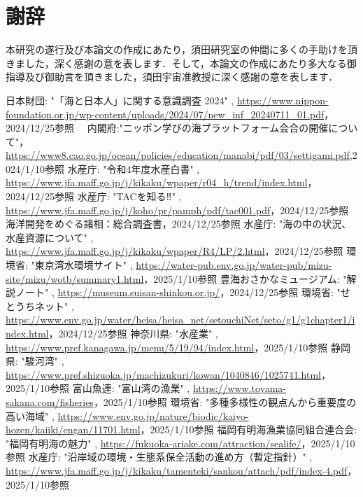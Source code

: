 \documentclass[12pt,a4j,titlepage]{ltjsarticle}
\begin{document}
\section{謝辞}
本研究の遂行及び本論文の作成にあたり，須田研究室の仲間に多くの手助けを頂きました，深く感謝の意を表します．そして，本論文の作成にあたり多大なる御指導及び御助言を頂きました，須田宇宙准教授に深く感謝の意を表します．
\clearpage

\begin{thebibliography}{99}
  日本財団: "「海と日本人」に関する意識調査 2024" , \url{https://www.nippon-foundation.or.jp/wp-content/uploads/2024/07/new_inf_20240711_01.pdf}，2024/12/25参照
　内閣府:"ニッポン学びの海プラットフォーム会合の開催について"，\url{https://www8.cao.go.jp/ocean/policies/education/manabi/pdf/03/settigami.pdf},2024/1/10参照
  水産庁: "令和4年度水産白書" , \url{https://www.jfa.maff.go.jp/j/kikaku/wpaper/r04_h/trend/index.html}，2024/12/25参照
  水産庁: "TACを知る‼︎" , \url{https://www.jfa.maff.go.jp/j/koho/pr/pamph/pdf/tac001.pdf}，2024/12/25参照
  海洋開発をめぐる諸相：総合調査書，2024/12/25参照
  水産庁: "海の中の状況、水産資源について" , \url{https://www.jfa.maff.go.jp/j/kikaku/wpaper/R4/LP/2.html}，2024/12/25参照
  環境省: "東京湾水環境サイト" , \url{https://water-pub.env.go.jp/water-pub/mizu-site/mizu/wotb/summary1.html}，2025/1/10参照
  豊海おさかなミュージアム: "解説ノート" , \url{https://museum.suisan-shinkou.or.jp/}，2024/12/25参照
  環境省: "せとうちネット" , \url{https://www.env.go.jp/water/heisa/heisa_net/setouchiNet/seto/g1/g1chapter1/index.html}，2024/12/25参照
  神奈川県: "水産業" , \url{https://www.pref.kanagawa.jp/menu/5/19/94/index.html}，2025/1/10参照
  静岡県: "駿河湾" , \url{https://www.pref.shizuoka.jp/machizukuri/kowan/1040846/1025741.html}，2025/1/10参照
  富山魚連: "富山湾の漁業" , \url{https://www.toyama-sakana.com/fisheries}，2025/1/10参照
  環境省: "多種多様性の観点んから重要度の高い海域" , \url{https://www.env.go.jp/nature/biodic/kaiyo-hozen/kaiiki/engan/11701.html}，2025/1/10参照
  福岡有明海漁業協同組合連合会: "福岡有明海の魅力" , \url{https://fukuoka-ariake.com/attraction/sealife/}，2025/1/10参照
  水産庁: "沿岸域の環境・生態系保全活動の進め方（暫定指針）" , \url{https://www.jfa.maff.go.jp/j/kikaku/tamenteki/sankou/attach/pdf/index-4.pdf}，2025/1/10参照

\end{thebibliography}
\end{document}

